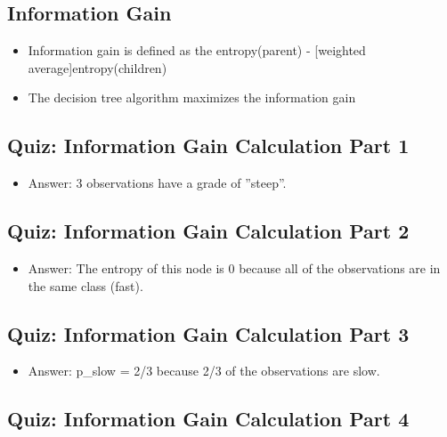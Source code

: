 \documentclass[12pt]{report}
\begin{document}
\subsection{Information Gain}

\begin{itemize}

\item Information gain is defined as the entropy(parent) - [weighted average]entropy(children)

\item The decision tree algorithm maximizes the information gain

\end{itemize}

\subsection{Quiz: Information Gain Calculation Part 1}

\begin{itemize}

\item Answer: 3 observations have a grade of ''steep''. 

\end{itemize}

\subsection{Quiz: Information Gain Calculation Part 2}

\begin{itemize}

\item Answer: The entropy of this node is 0 because all of the observations are in the same class (fast). 

\end{itemize}

\subsection{Quiz: Information Gain Calculation Part 3}

\begin{itemize}

\item Answer: p\_slow = 2/3 because 2/3 of the observations are slow. 

\end{itemize}

\subsection{Quiz: Information Gain Calculation Part 4}
\end{document}
